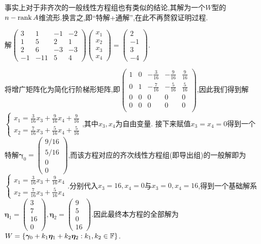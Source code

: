\documentclass[openany]{book}
\begin{document}
事实上对于非齐次的一般线性方程组也有类似的结论,其解为一个$W$型的$n-\operatorname{rank} A$维流形.换言之,即``特解+通解'',在此不再赘叙证明过程.

\begin{example}
    解$\begin{pmatrix}
        3&1&-1&-2\\1&5&2&1\\2&6&-3&-3\\-1&-11&5&4
    \end{pmatrix}\begin{pmatrix}
        x_1\\x_2\\x_3\\x_4
    \end{pmatrix}=\begin{pmatrix}
        2\\-1\\3\\-4
    \end{pmatrix}$.
    
    将增广矩阵化为简化行阶梯形矩阵,即$\begin{pmatrix}
        1&0&-\frac{3}{16}&-\frac{9}{16}&\frac{9}{16}\\0&1&-\frac{7}{16}&-\frac{5}{16}&\frac{5}{16}\\0&0&0&0&0\\0&0&0&0&0\\
    \end{pmatrix}$,因此我们得到解$\begin{cases}
        x_1=\frac{3}{16}x_3+\frac{9}{16}x_4+\frac{9}{16}\\x_2=\frac{7}{16}x_3+\frac{5}{16}x_4+\frac{5}{16}
    \end{cases}$,其中$x_3,x_4$为自由变量.
    接下来赋值$x_3=x_4=0$得到一个特解$\bm{\gamma}_0=\begin{pmatrix}
        9/16\\5/16\\0\\0
    \end{pmatrix}$,而该方程对应的齐次线性方程组(即导出组)的一般解即为$\begin{cases}
        x_1=\frac{3}{16}x_3+\frac{9}{16}x_4\\x_2=\frac{7}{16}x_3+\frac{5}{16}x_4
    \end{cases}$.分别代入$x_3=16,x_4=0$与$x_3=0,x_4=16$,得到一个基础解系$\bm{\eta}_1=\begin{pmatrix}
        3\\7\\16\\0
    \end{pmatrix},\bm{\eta}_2=\begin{pmatrix}
        9\\5\\0\\16
    \end{pmatrix}$.因此最终本方程的全部解为$W=\left\{\bm{\gamma}_0+k_1\bm{\eta}_1+k_2\bm{\eta}_2:k_1,k_2\in \mathbb{F}\right\}$.
\end{example}
\end{document}
